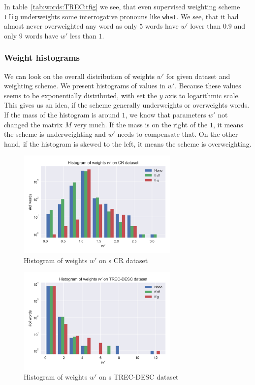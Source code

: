     In table~\ref{tab:words:TREC:tfig} we see, that even supervised weighting scheme \texttt{tfig} underweights some interrogative pronouns like \texttt{what}.
    We see, that it had almost never overweighted any word as only $5$ words have $w'$ lover than $0.9$ and only $9$ words have $w'$ less than $1$.

    \newpage
    \subsubsection{Weight histograms}
    
    We can look on the overall distribution of weights $w'$ for given dataset and weighting scheme.
    We present histograms of values in $w'$.
    Because these values seems to be exponentially distributed, with set the $y$ axis to logarithmic scale.
    This gives us an idea, if the scheme generally underweights or overweights words.
    If the mass of the histogram is around $1$, we know that parameters $w'$ not changed the matrix $M$ very much.
    If the mass is on the right of the $1$, it means the scheme is underweighting and $w'$ needs to compensate that. On the other hand, if the histogram is skewed to the left, it means the scheme is overweighting.
    
    
    
    \begin{figure}
    \centerline{\includegraphics[width=0.7\textwidth]{images/histw_cr.png}}
    \caption[Histogram of weights $w'$ on s CR dataset]{Histogram of weights $w'$ on s CR dataset}
    \label{obr:hist:cr}
    \end{figure}

    \begin{figure}
    \centerline{\includegraphics[width=0.7\textwidth]{images/histw_desc.png}}
    \caption[Histogram of weights $w'$ on s TREC-DESC dataset]{Histogram of weights $w'$ on s TREC-DESC dataset}
    \label{obr:hist:desc}
    \end{figure}

